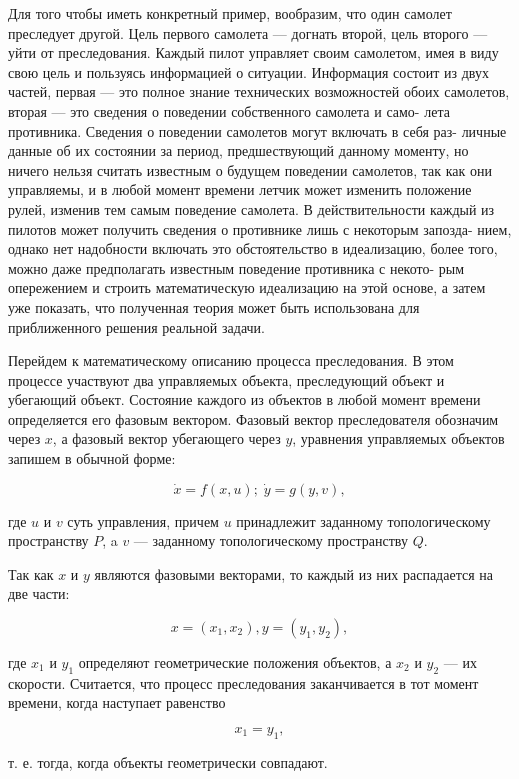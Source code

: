\documentclass[10pt]{article}
\begin{document}
Для того чтобы иметь конкретный пример, вообразим, что один самолет преследует другой. Цель первого самолета — догнать второй, цель второго — уйти от преследования. Каждый пилот управляет своим самолетом, имея в виду свою цель и пользуясь информацией о ситуации. Информация состоит из двух частей, первая — это полное знание технических возможностей обоих самолетов, вторая — это сведения о поведении собственного самолета и само- лета противника. Сведения о поведении самолетов могут включать в себя раз- личные данные об их состоянии за период, предшествующий данному моменту, но ничего нельзя считать известным о будущем поведении самолетов, так как они управляемы, и в любой момент времени летчик может изменить положение рулей, изменив тем самым поведение самолета. В действительности каждый из пилотов может получить сведения о противнике лишь с некоторым запозда- нием, однако нет надобности включать это обстоятельство в идеализацию, более того, можно даже предполагать известным поведение противника с некото- рым опережением и строить математическую идеализацию на этой основе, а затем уже показать, что полученная теория может быть использована для приближенного решения реальной задачи.

Перейдем к математическому описанию процесса преследования. В этом процессе участвуют два управляемых объекта, преследующий объект и убегающий объект. Состояние каждого из объектов в любой момент времени определяется его фазовым вектором. Фазовый вектор преследователя обозначим через \(x\), а фазовый вектор убегающего через \(y\), уравнения управляемых объектов запишем в обычной форме:

\[
\dot{x} = f\left( {x,u}\right) ;\;\dot{y} = g\left( {y,v}\right), \tag{1}
\]

где \(u\) и \(v\) суть управления, причем \(u\) принадлежит заданному топологическому пространству \(P\), a \(v\) — заданному топологическому пространству \(Q\).

Так как \(x\) и \(y\) являются фазовыми векторами, то каждый из них распадается на две части:

\[
x = \left( {{x}_{1},{x}_{2}}\right),y = \left( {{y}_{1},{y}_{2}}\right),
\]

где \({x}_{1}\) и \({y}_{1}\) определяют геометрические положения объектов, а \({x}_{2}\) и \({y}_{2}\) — их скорости. Считается, что процесс преследования заканчивается в тот момент времени, когда наступает равенство

\[
{x}_{1} = {y}_{1}, \tag{2}
\]

т. е. тогда, когда объекты геометрически совпадают.
\end{document}
